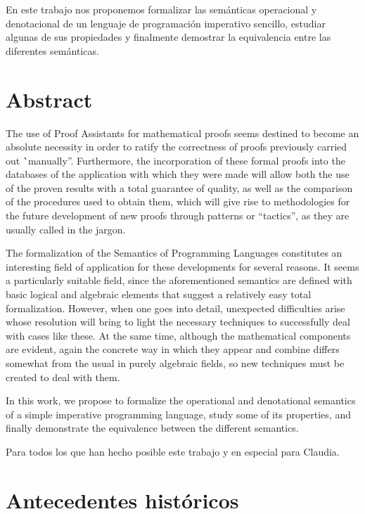 \documentclass[
  a4paper, 
  10pt, 
  parskip=half, 
  toc=bibliography,
]{scrbook}
\theoremstyle{definition}
\theoremstyle{bolddef}
\renewenvironment{dedication}
  {\clearpage           %
   \thispagestyle{empty}%
   \vspace*{\stretch{1}}%
   \itshape             %
   \raggedleft{}          %
  }
  {\/
   \par %
   \vspace{\stretch{3}} %
   \clearpage           %
  }
\begin{document}
En este trabajo nos proponemos formalizar las semánticas operacional y denotacional de un
lenguaje de programación imperativo sencillo, estudiar algunas de sus propiedades y
finalmente demostrar la equivalencia entre las diferentes semánticas.

\chapter*{Abstract}

The use of Proof Assistants for mathematical proofs seems destined to become an absolute necessity in order to 
ratify the correctness of proofs previously carried out \``manually''. Furthermore, the incorporation of these formal 
proofs into the databases of the application with which they were made will allow both the use of the proven results 
with a total guarantee of quality, as well as the comparison of the procedures used to obtain them, 
which will give rise to methodologies for the future development of new proofs through patterns or ``tactics'', 
as they are usually called in the jargon.

The formalization of the Semantics of Programming Languages constitutes an interesting field of application for these 
developments for several reasons. It seems a particularly suitable field, since the 
aforementioned semantics are defined with basic logical and algebraic elements that suggest a relatively easy 
total formalization. However, when one goes into detail, unexpected difficulties arise whose resolution will bring to 
light the necessary techniques to successfully deal with cases like these. At the same time, although the mathematical 
components are evident, again the concrete way in which they appear and combine differs somewhat from the usual in 
purely algebraic fields, so new techniques must be created to deal with them.

In this work, we propose to formalize the operational and denotational semantics of a simple imperative programming 
language, study some of its properties, and finally demonstrate the equivalence between the different semantics.
\@openrighttrue\makeatother 

\begin{dedication}
  Para todos los que han hecho posible este trabajo y en especial para Claudia.
\end{dedication}

\tableofcontents

\chapter{Antecedentes históricos}
\end{document}
